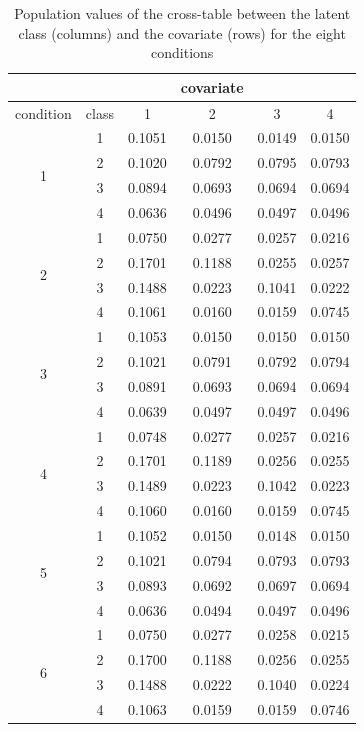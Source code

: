 \documentclass[a4paper, 11pt]{article} %
\begin{document}
\begin{table}[h]
\centering
\footnotesize
\caption{Population values of the cross-table between the latent class (columns) and the covariate (rows) for the eight conditions}
\label{A_Table_Prop}
\begin{tabular}{cc cccc}
\hline
 && &covariate  & \\
  \hline
 condition & class & 1 & 2 & 3 & 4 \\ 
  \hline
  \multirow{4}{*}{1}
 &1 & 0.1051 & 0.0150 & 0.0149 & 0.0150 \\ 
 & 2 & 0.1020 & 0.0792 & 0.0795 & 0.0793 \\ 
 & 3 & 0.0894 & 0.0693 & 0.0694 & 0.0694 \\ 
 & 4 & 0.0636 & 0.0496 & 0.0497 & 0.0496 \\ 
   \hline
  \multirow{4}{*}{2}
& 1 & 0.0750 & 0.0277 & 0.0257 & 0.0216 \\ 
 & 2 & 0.1701 & 0.1188 & 0.0255 & 0.0257 \\ 
 & 3 & 0.1488 & 0.0223 & 0.1041 & 0.0222 \\ 
 & 4 & 0.1061 & 0.0160 & 0.0159 & 0.0745 \\ 
   \hline
  \multirow{4}{*}{3}
&1 & 0.1053 & 0.0150 & 0.0150 & 0.0150 \\ 
&  2 & 0.1021 & 0.0791 & 0.0792 & 0.0794 \\ 
&  3 & 0.0891 & 0.0693 & 0.0694 & 0.0694 \\ 
&  4 & 0.0639 & 0.0497 & 0.0497 & 0.0496 \\ 
  \hline
  \multirow{4}{*}{4}
&1 & 0.0748 & 0.0277 & 0.0257 & 0.0216 \\ 
&  2 & 0.1701 & 0.1189 & 0.0256 & 0.0255 \\ 
&  3 & 0.1489 & 0.0223 & 0.1042 & 0.0223 \\ 
&  4 & 0.1060 & 0.0160 & 0.0159 & 0.0745 \\
 \hline
  \multirow{4}{*}{5}
&1 & 0.1052 & 0.0150 & 0.0148 & 0.0150 \\ 
&  2 & 0.1021 & 0.0794 & 0.0793 & 0.0793 \\ 
&  3 & 0.0893 & 0.0692 & 0.0697 & 0.0694 \\ 
&  4 & 0.0636 & 0.0494 & 0.0497 & 0.0496 \\ 
 \hline
  \multirow{4}{*}{6}
&1 & 0.0750 & 0.0277 & 0.0258 & 0.0215 \\ 
&  2 & 0.1700 & 0.1188 & 0.0256 & 0.0255 \\ 
&  3 & 0.1488 & 0.0222 & 0.1040 & 0.0224 \\ 
&  4 & 0.1063 & 0.0159 & 0.0159 & 0.0746 \\ 

\end{tabular}
\end{table}
\end{document}
